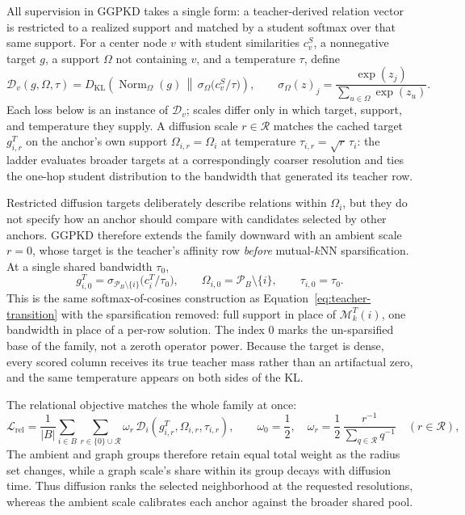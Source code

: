 All supervision in GGPKD takes a single form: a teacher-derived relation vector is restricted to a realized support and matched by a student softmax over that same support. For a center node $v$ with student similarities $c^S_v$, a nonnegative target $g$, a support $\Omega$ not containing $v$, and a temperature $\tau$, define
\begin{equation}
\mathcal D_v(g,\Omega,\tau)
=D_{\mathrm{KL}}\!\left(\operatorname{Norm}_\Omega(g)\,\middle\|\,
\sigma_\Omega\!\bigl(c^S_v/\tau\bigr)\right),
\qquad
\sigma_\Omega(z)_j=\frac{\exp(z_j)}{\sum_{u\in\Omega}\exp(z_u)}.
\label{eq:local-matching}
\end{equation}
Each loss below is an instance of $\mathcal D_v$; scales differ only in which target, support, and temperature they supply. A diffusion scale $r\in\mathcal R$ matches the cached target $g^T_{i,r}$ on the anchor's own support $\Omega_{i,r}=\Omega_i$ at temperature $\tau_{i,r}=\sqrt r\,\tau_i$: the ladder evaluates broader targets at a correspondingly coarser resolution and ties the one-hop student distribution to the bandwidth that generated its teacher row.

Restricted diffusion targets deliberately describe relations within $\Omega_i$, but they do not specify how an anchor should compare with candidates selected by other anchors. GGPKD therefore extends the family downward with an ambient scale $r=0$, whose target is the teacher's affinity row \emph{before} mutual-$k$NN sparsification. At a single shared bandwidth $\tau_0$,
\begin{equation}
g^T_{i,0}=\sigma_{\mathcal P_B\setminus\{i\}}\!\bigl(c^T_i/\tau_0\bigr),
\qquad
\Omega_{i,0}=\mathcal P_B\setminus\{i\},
\qquad
\tau_{i,0}=\tau_0.
\label{eq:ambient-scale}
\end{equation}
This is the same softmax-of-cosines construction as Equation~\eqref{eq:teacher-transition} with the sparsification removed: full support in place of $\mathcal M_k^T(i)$, one bandwidth in place of a per-row solution. The index $0$ marks the un-sparsified base of the family, not a zeroth operator power. Because the target is dense, every scored column receives its true teacher mass rather than an artifactual zero, and the same temperature appears on both sides of the KL.

The relational objective matches the whole family at once:
\begin{equation}
\mathcal L_{\mathrm{rel}}
=\frac1{|B|}\sum_{i\in B}
\sum_{r\in\{0\}\cup\mathcal R}
\omega_r\,\mathcal D_i\!\left(g^T_{i,r},\Omega_{i,r},\tau_{i,r}\right),
\qquad
\omega_0=\frac12,
\quad
\omega_r=\frac12\,
\frac{r^{-1}}{\sum_{q\in\mathcal R}q^{-1}}
\quad(r\in\mathcal R),
\label{eq:relational-loss}
\end{equation}
The ambient and graph groups therefore retain equal total weight as the radius set changes, while a graph scale's share within its group decays with diffusion time. Thus diffusion ranks the selected neighborhood at the requested resolutions, whereas the ambient scale calibrates each anchor against the broader shared pool.

